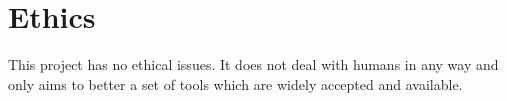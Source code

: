 %
%
\section{Ethics}

    This project has no ethical issues. It does not deal with humans in any way
    and only aims to better a set of tools which are widely accepted and
    available.

